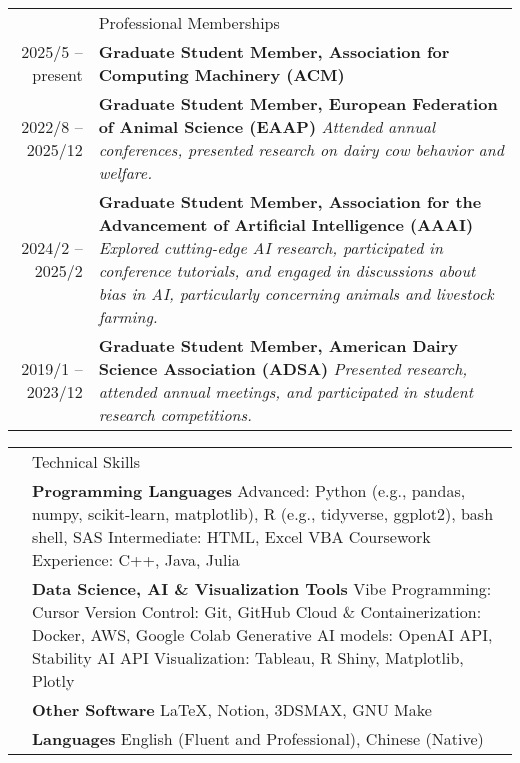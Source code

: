 \documentclass[letterpaper, 11pt]{article}
\newcommand{\headingfont}{\Large\color{OliveGreen}}
\newenvironment{SectionTable}[1]{
	\renewcommand*{\arraystretch}{1.7}
	\setlength{\tabcolsep}{10pt}
	\begin{longtable}{Rp{5.2in}} & #1 \\}
{\end{longtable}\vspace{-.3cm}}
\begin{document}
\begin{SectionTable}{\headingfont Professional Memberships}
2025/5 -- present &
\textbf{Graduate Student Member, Association for Computing Machinery (ACM)} \\
2022/8 -- 2025/12 &
\textbf{Graduate Student Member, European Federation of Animal Science (EAAP)} \newline
\textit{Attended annual conferences, presented research on dairy cow behavior and welfare.} \\
2024/2 -- 2025/2 &
\textbf{Graduate Student Member, Association for the Advancement of Artificial Intelligence (AAAI)} \newline
\textit{Explored cutting-edge AI research, participated in conference tutorials, and engaged in discussions about bias in AI, particularly concerning animals and livestock farming.} \\
2019/1 -- 2023/12 &
\textbf{Graduate Student Member, American Dairy Science Association (ADSA)} \newline
\textit{Presented research, attended annual meetings, and participated in student research competitions.} \\
\end{SectionTable}

\begin{SectionTable}{\headingfont Technical Skills}
& \textbf{Programming Languages} \newline
Advanced: Python (e.g., pandas, numpy, scikit-learn, matplotlib), R (e.g., tidyverse, ggplot2), bash shell, SAS \newline
Intermediate: HTML, Excel VBA \newline
Coursework Experience: C++, Java, Julia \\
& \textbf{Data Science, AI \& Visualization Tools} \newline
Vibe Programming: Cursor \newline
Version Control: Git, GitHub \newline
Cloud \& Containerization: Docker, AWS, Google Colab\newline
Generative AI models: OpenAI API, Stability AI API\newline
Visualization: Tableau, R Shiny, Matplotlib, Plotly \\
& \textbf{Other Software} \newline
\LaTeX, Notion, 3DSMAX, GNU Make \\
& \textbf{Languages} \newline
English (Fluent and Professional), Chinese (Native)
\end{SectionTable}


\end{document}
